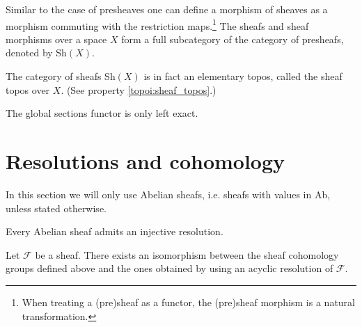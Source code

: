 	\begin{notation}
		Similar to the case of presheaves one can define a morphism of sheaves as a morphism commuting with the restriction maps.\footnote{When treating a (pre)sheaf as a functor, the (pre)sheaf morphism is a natural transformation.} The sheafs and sheaf morphisms over a space $X$ form a full subcategory of the category of presheafs, denoted by Sh$(X)$.
	\end{notation}
	
	\begin{property}
		The category of sheafs Sh$(X)$ is in fact an elementary topos, called the sheaf topos over $X$. (See property \ref{topoi:sheaf_topos}.)
	\end{property}
	
	\begin{property}
		The global sections functor is only left exact.
	\end{property}
	
\section{Resolutions and cohomology}

	In this section we will only use Abelian sheafs, i.e. sheafs with values in Ab, unless stated otherwise.

	\begin{property}
		Every Abelian sheaf admits an injective resolution.
	\end{property}
	\begin{theorem}
		Let $\mathcal{F}$ be a sheaf. There exists an isomorphism between the sheaf cohomology groups defined above and the ones obtained by using an acyclic resolution of $\mathcal{F}$.
	\end{theorem}
	
